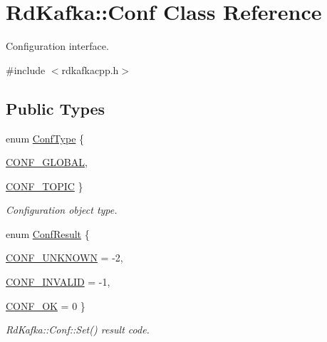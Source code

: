 \hypertarget{classRdKafka_1_1Conf}{
\section{RdKafka::Conf Class Reference}
\label{classRdKafka_1_1Conf}
}


Configuration interface.  


{\ttfamily \#include $<$rdkafkacpp.h$>$}\subsection*{Public Types}
\begin{DoxyCompactItemize}
\item 
enum \hyperlink{classRdKafka_1_1Conf_a118f3a1435b5379ec999daac9d84f001}{ConfType} \{ \par
\hyperlink{classRdKafka_1_1Conf_a118f3a1435b5379ec999daac9d84f001a4e81d66df545d825efcfbd2c279f8d05}{CONF\_\-GLOBAL}, 
\par
\hyperlink{classRdKafka_1_1Conf_a118f3a1435b5379ec999daac9d84f001a7b0aad93bf57f0274f0d9632af238388}{CONF\_\-TOPIC}
 \}
\begin{DoxyCompactList}\small\item\em Configuration object type. \item\end{DoxyCompactList}\item 
enum \hyperlink{classRdKafka_1_1Conf_a1d023a689c09f42ab18b7bd1d15a11a6}{ConfResult} \{ \par
\hyperlink{classRdKafka_1_1Conf_a1d023a689c09f42ab18b7bd1d15a11a6acadd966f4a2fc7af06c40c5797d6c770}{CONF\_\-UNKNOWN} =  -\/2, 
\par
\hyperlink{classRdKafka_1_1Conf_a1d023a689c09f42ab18b7bd1d15a11a6a52341920e079d64196690c9716185cf4}{CONF\_\-INVALID} =  -\/1, 
\par
\hyperlink{classRdKafka_1_1Conf_a1d023a689c09f42ab18b7bd1d15a11a6a24a2953f4b85e58c6915031fd7c4f52f}{CONF\_\-OK} =  0
 \}
\begin{DoxyCompactList}\small\item\em RdKafka::Conf::Set() result code. \item\end{DoxyCompactList}\end{DoxyCompactItemize}
